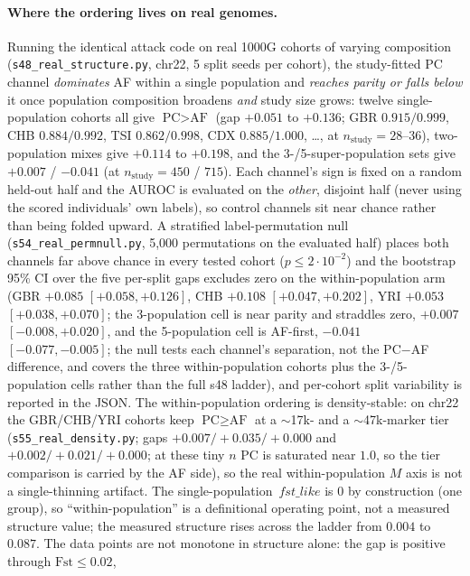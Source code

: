 \documentclass[11pt]{article}
\begin{document}
\paragraph{Where the ordering lives on real genomes.} Running the identical
attack code on real 1000G cohorts of varying composition
(\texttt{s48\_real\_structure.py}, chr22, 5 split seeds per cohort), the
study-fitted PC channel \emph{dominates} AF within a single population and
\emph{reaches parity or falls below} it once population composition broadens
\emph{and} study size
grows: twelve single-population cohorts all give $\text{PC}>\text{AF}$ (gap
$+0.051$ to $+0.136$; GBR $0.915/0.999$, CHB $0.884/0.992$, TSI $0.862/0.998$,
CDX $0.885/1.000$, \ldots, at $n_{\text{study}}{=}28$--$36$), two-population
mixes give $+0.114$ to $+0.198$, and the 3-/5-super-population sets give
$+0.007$ / $-0.041$ (at $n_{\text{study}}{=}450$ / $715$). Each channel's sign is
fixed on a random held-out half and the AUROC is evaluated on the \emph{other},
disjoint half (never using the scored individuals' own labels), so control
channels sit near chance rather than being folded upward. A stratified
label-permutation null
(\texttt{s54\_real\_permnull.py}, 5{,}000 permutations on the evaluated half)
places both channels far above chance in every tested cohort
($p\le2\cdot10^{-2}$) and the bootstrap 95\% CI over the five per-split gaps
excludes zero on the within-population arm (GBR $+0.085$ $[+0.058,+0.126]$,
CHB $+0.108$ $[+0.047,+0.202]$, YRI $+0.053$ $[+0.038,+0.070]$; the 3-population
cell is near parity and straddles zero, $+0.007$ $[-0.008,+0.020]$, and the
5-population cell is
AF-first, $-0.041$ $[-0.077,-0.005]$; the null tests each channel's separation,
not the PC$-$AF difference, and covers the three within-population cohorts plus
the 3-/5-population cells rather than the full s48 ladder), and per-cohort split
variability is reported in the
JSON. The within-population ordering is density-stable: on chr22 the GBR/CHB/YRI
cohorts keep $\text{PC}\ge\text{AF}$ at a $\sim$17k- and a $\sim$47k-marker tier
(\texttt{s55\_real\_density.py}; gaps $+0.007/+0.035/+0.000$ and
$+0.002/+0.021/+0.000$; at these tiny $n$ PC is saturated near $1.0$, so the
tier comparison is carried by the AF side), so the real within-population $M$
axis is not a single-thinning artifact. The single-population
$\,fst\_like$ is $0$ by construction (one group), so ``within-population'' is a
definitional operating point, not a measured structure value; the measured
structure rises across the ladder from $0.004$ to $0.087$. The data points are
not monotone in structure alone: the gap is positive through $\text{Fst}\le0.02$,
\end{document}
